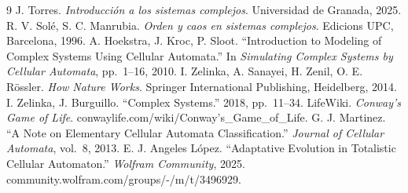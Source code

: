 \documentclass[a4paper,11pt]{article}
\begin{document}
{\footnotesize
\begin{thebibliography}{9}\setlength{\itemsep}{1pt}\setlength{\parsep}{0pt}
 J. Torres. \textit{Introducción a los sistemas complejos}. Universidad de Granada, 2025.
 R. V. Solé, S. C. Manrubia. \textit{Orden y caos en sistemas complejos}. Edicions UPC, Barcelona, 1996.
 A. Hoekstra, J. Kroc, P. Sloot. ``Introduction to Modeling of Complex Systems Using Cellular Automata.'' In \textit{Simulating Complex Systems by Cellular Automata}, pp.\ 1--16, 2010.
 I. Zelinka, A. Sanayei, H. Zenil, O. E. Rössler. \textit{How Nature Works}. Springer International Publishing, Heidelberg, 2014.
 I. Zelinka, J. Burguillo. ``Complex Systems.'' 2018, pp.\ 11--34.
 LifeWiki. \textit{Conway's Game of Life}. conwaylife.com/wiki/Conway's\_Game\_of\_Life.
 G. J. Martinez. ``A Note on Elementary Cellular Automata Classification.'' \textit{Journal of Cellular Automata}, vol.\ 8, 2013.
 E. J. Angeles L\'opez. ``Adaptative Evolution in Totalistic Cellular Automaton.'' \textit{Wolfram Community}, 2025. community.wolfram.com/groups/-/m/t/3496929.
\end{thebibliography}
}
\end{document}
